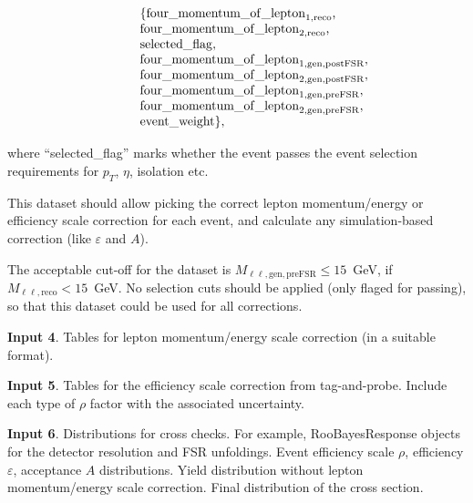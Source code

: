 \documentclass[a4paper]{article}
\begin{document}
\begin{equation}
\begin{tabular}{cl}\\
\phantom{xxx} &
$
  \{
  \mathrm{four\_momentum\_of\_lepton}_{1,\mathrm{reco}}$,\\
&  $\mathrm{four\_momentum\_of\_lepton}_{2,\mathrm{reco}}$,\\
&  $\mathrm{selected\_flag},$\\
&  $\mathrm{four\_momentum\_of\_lepton}_{1,\mathrm{gen,postFSR}},$\\
&  $\mathrm{four\_momentum\_of\_lepton}_{2,\mathrm{gen,postFSR}},$\\
&  $\mathrm{four\_momentum\_of\_lepton}_{1,\mathrm{gen,preFSR}},$\\
&  $\mathrm{four\_momentum\_of\_lepton}_{2,\mathrm{gen,preFSR}},$\\
&  $\mathrm{event\_weight}
  \},$
\end{tabular}
\end{equation}

\noindent
where ``selected\_flag'' marks whether the event passes the event
selection requirements for $p_T$, $\eta$, isolation etc.

This dataset should allow picking the correct lepton momentum/energy
or efficiency scale correction for each event, and calculate any
simulation-based correction (like $\varepsilon$ and $A$).

The acceptable cut-off for the dataset is
$M_{\ell\ell,\mathrm{gen,preFSR}}\leq15$~GeV, if
$M_{\ell\ell,\mathrm{reco}}<15$~GeV. No selection cuts should be
applied (only flaged for passing), so that this dataset could be used
for all corrections.

\medskip

{\bf Input 4}. Tables for lepton momentum/energy scale correction (in
a suitable format).

\medskip

{\bf Input 5}. Tables for the efficiency scale correction from
tag-and-probe. Include each type of $\rho$ factor with the associated
uncertainty.

\medskip

{\bf Input 6}. Distributions for cross checks. For example,
RooBayesResponse objects for the detector resolution and FSR
unfoldings. Event efficiency scale $\rho$, efficiency $\varepsilon$,
acceptance $A$ distributions. Yield distribution without lepton
momentum/energy scale correction.
Final distribution of the cross section.
\end{document}
